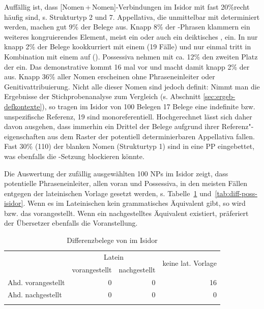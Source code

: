 Auffällig ist, dass [Nomen\,+\,Nomen]-Verbindungen im Isidor mit fast 20\%\linebreak recht häufig sind, s. Strukturtyp 2 und 7.  Appellativa, die unmittelbar mit  determiniert werden, machen gut 9\% der Belege aus. Knapp 8\% der -Phrasen  klammern ein weiteres kongruierendes Element, meist ein  oder auch ein deiktisches , ein. In nur knapp 2\% der Belege kookkurriert  mit einem  (19 Fälle) und nur einmal tritt  in Kombination mit einem  auf (). Possessiva  nehmen mit ca. 12\% den zweiten Platz der  ein. Das demonstrative   kommt 16 mal vor und macht damit  knapp 2\% der  aus. Knapp 36\% aller Nomen erscheinen ohne Phraseneinleiter oder  Genitivattribuierung. Nicht alle dieser Nomen sind jedoch definit:  Nimmt man die Ergebnisse der Stichprobenanalyse zum Vergleich (s. Abschnitt \ref{sec:ergeb-defkontexte}), so tragen im Isidor von 100 Belegen 17 Belege eine indefinite   bzw. unspezifische  Referenz, 19 sind monoreferentiell. Hochgerechnet lässt sich daher davon ausgehen, dass immerhin ein Drittel der Belege aufgrund ihrer Referenz"-eigenschaften aus dem Raster der potentiell determinierbaren  Appellativa fallen. Fast 30\% (110) der blanken Nomen (Strukturtyp 1) sind in eine PP eingebettet, was ebenfalls die -Setzung blockieren könnte. 

Die Auswertung der zufällig ausgewählten 100 NPs im Isidor zeigt, dass potentielle Phraseneinleiter, allen voran  und  Possessiva, in den meisten Fällen entgegen der lateinischen Vorlage gesetzt werden, s. Tabelle~\ref{tab:diff-ther-isidor} und~\ref{tab:diff-poss-isidor}. Wenn es im Lateinischen kein grammatisches Äquivalent gibt, so wird  bzw. das  vorangestellt. Wenn ein nachgestelltes Äquivalent existiert, präferiert der Übersetzer ebenfalls die Voranstellung.

\begin{table}
\centering
\begin{tabular}{lrrr}
\lsptoprule
                   & \multicolumn{2}{c}{Latein} & \multirow{2}{*}{keine lat. Vorlage}\\
 \cmidrule(lr){2-3}
                   & vorangestellt & nachgestellt & \\ \midrule
Ahd. vorangestellt & 0                  & 0                 & 16                    \\
Ahd. nachgestellt  & 0                  & 0                 & 0                    \\ \lspbottomrule
\end{tabular}
\caption{Differenzbelege  von  im Isidor}
\label{tab:diff-ther-isidor}
\end{table}

